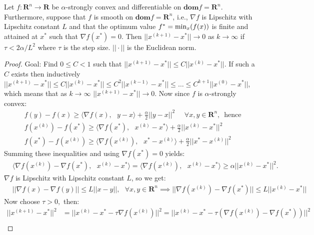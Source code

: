 \begin{proposition}\label{pf_gd_sc_L}
Let $f: \mathbf{R}^{n}\longrightarrow \mathbf{R}$ be $\alpha$-strongly convex and differentiable on $\textbf{dom}f = \mathbf{R}^{n}.$ Furthermore, suppose that $f$ is smooth on $\textbf{dom}f = \mathbf{R}^{n}$, i.e., $\nabla f$ is Lipschitz with Lipschitz constant $L$ and that the optimum value $f^{*} = \textnormal{min}_{x}(f(x))$ is finite and attained at $x^{*}$ such that $\nabla f(x^{*})=0.$ Then $||x^{(k+1)}-x^{*}|| \rightarrow 0$ as $k \rightarrow \infty$ if $\tau < 2\alpha/L^{2}$ where $\tau$ is the step size. $||\cdot||$ is the Euclidean norm. 
\end{proposition}
\begin{proof}
Goal: Find $0\leq C < 1$ such that $||x^{(k+1)} - x^{*}|| \leq C||x^{(k)} - x^{*}||.$ If such a $C$ exists then inductively $||x^{(k+1)} - x^{*}|| \leq C||x^{(k)} - x^{*}|| \leq C^{2}||x^{(k-1)} - x^{*}|| \leq \ldots \leq C^{k+1}||x^{(0)} - x^{*}||$, which means that as $k\rightarrow \infty$ $||x^{(k+1)} - x^{*}|| \rightarrow 0.$ Now since $f$ is $\alpha$-strongly convex:
\begin{align}
    &f(y) - f(x) \geq \langle \nabla f(x),\text{ } y-x\rangle + \frac{\alpha}{2}||y-x||^{2} \text{ }\text{ } \forall x,y \in \mathbf{R}^{n}\text{,} \text{ } \text{hence} \nonumber\\
    &f(x^{(k)}) - f(x^{*}) \geq \langle \nabla f(x^{*}),\text{ } x^{(k)}-x^{*}\rangle + \frac{\alpha}{2}||x^{(k)}-x^{*}||^{2}\nonumber\\
    &f(x^{*}) - f(x^{(k)}) \geq \langle \nabla f(x^{(k)}),\text{ } x^{*}-x^{(k)}\rangle + \frac{\alpha}{2}||x^{*}-x^{(k)}||^{2}\nonumber
\end{align}
Summing these inequalities and using $\nabla f(x^{*}) = 0$ yields:
\begin{align}
    &\langle \nabla f(x^{(k)}) - \nabla f(x^{*}),\text{ } x^{(k)} - x^{*}\rangle = \langle \nabla f(x^{(k)}),\text{ } x^{(k)} - x^{*}\rangle \geq \alpha ||x^{(k)} - x^{*}||^{2}.
\end{align}
$\nabla f$ is Lipschitz with Lipschitz constant $L$, so we get:
\begin{align}
    &||\nabla f(x) - \nabla f(y)|| \leq L||x-y||,\text{ } \forall x, y \in \mathbf{R}^{n} \implies ||\nabla f(x^{(k)}) - \nabla f(x^{*})|| \leq L||x^{(k)}-x^{*}||
\end{align}
Now choose $\tau > 0,$ then:
\begin{align}
||x^{(k+1)}-x^{*}||^{2}
    &= ||x^{(k)}-x^{*}-\tau \nabla f(x^{(k)})||^{2} = ||x^{(k)}-x^{*}-\tau (\nabla f(x^{(k)})-\nabla f(x^{*}))||^{2}\nonumber\\

\end{align}
\end{proof}
